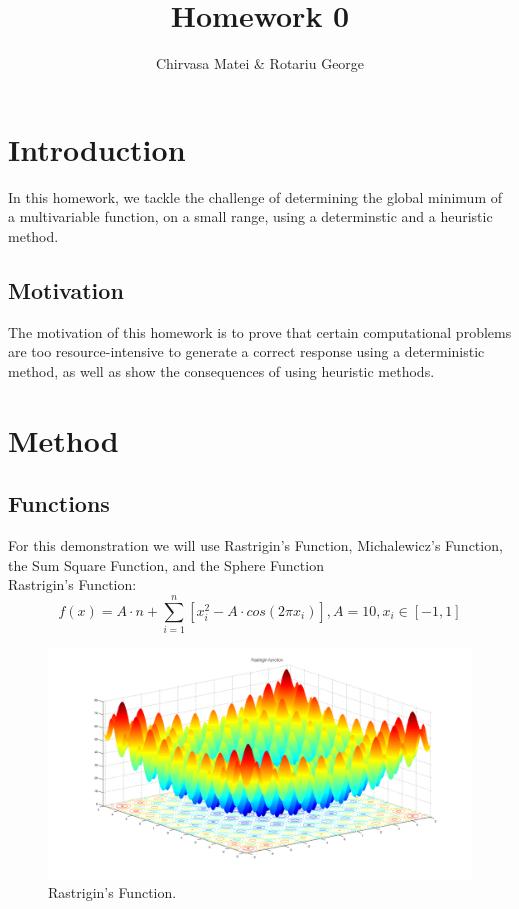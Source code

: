 \documentclass{article}
\author{Chirvasa Matei \& Rotariu George}
\title{Homework 0}
\begin{document}
\maketitle

\section{Introduction}
In this homework, we tackle the challenge of determining the global minimum of a multivariable function, on a small range, using a determinstic and a heuristic method.
\subsection{Motivation}
The motivation of this homework is to prove that certain computational problems are too resource-intensive to generate a correct response using a deterministic method, as well as show the consequences of using heuristic methods.

\section{Method}
\subsection{Functions}
For this demonstration we will use Rastrigin's Function\cite{Rastrigin}, Michalewicz's Function\cite{Michalwicz}, the Sum Square Function\cite{SumSquare}, and the Sphere Function\cite{Sphere}
\\Rastrigin's Function:
$$ f(x) = A \cdot n + \sum_{i=1}^n \left[ x_i^2 - A \cdot cos(2 \pi x_i) \right],
A = 10, x_i \in \left[ -1, 1 \right]$$

\begin{figure}[!ht]
  \includegraphics[width=\textwidth,height=\textheight,keepaspectratio]{Rastrigin_function}
  \caption{Rastrigin's Function.}
\end{figure}
\end{document}
